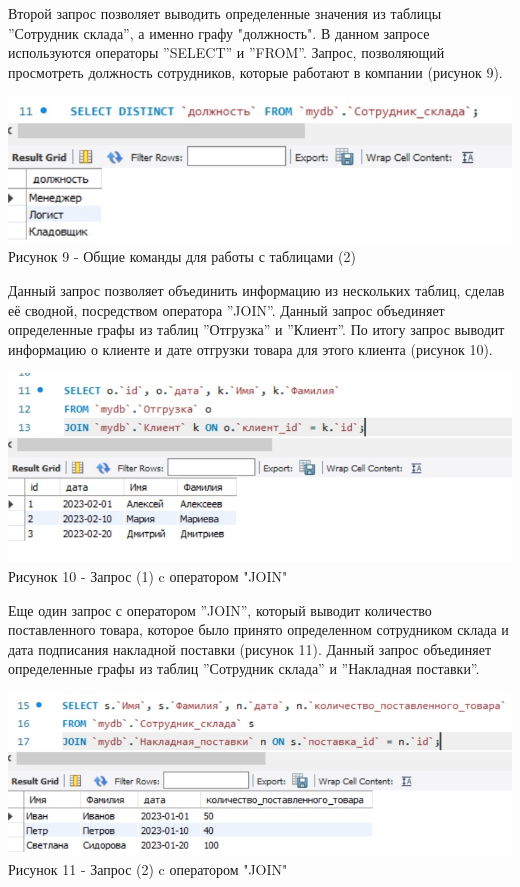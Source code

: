 \documentclass[14pt]{extreport}
\begin{document}
Второй запрос позволяет выводить определенные значения  из таблицы ''Сотрудник склада'', а именно графу "должность". В данном запросе используются операторы ''SELECT'' и ''FROM''. Запрос, позволяющий просмотреть должность сотрудников, которые работают в компании (рисунок 9).
\begin{center}
    \centering 
    \includegraphics[width=1.0\linewidth]{image2.png}
    \\Рисунок 9 - Общие команды для работы с таблицами (2)
\end{center}


Данный запрос позволяет объединить информацию из нескольких таблиц, сделав её сводной, посредством оператора ''JOIN''. Данный запрос объединяет определенные графы из таблиц ''Отгрузка'' и ''Клиент''. По итогу запрос выводит информацию о клиенте и дате отгрузки товара для этого клиента (рисунок 10).
\begin{center}
    \centering
    \includegraphics[width=1.0\linewidth]{image3.png}
    \\Рисунок 10 - Запрос (1) c оператором "JOIN" 
\end{center}


Еще один запрос с оператором ''JOIN'', который выводит количество поставленного товара, которое было принято определенном сотрудником склада и дата подписания накладной поставки (рисунок 11). Данный запрос объединяет определенные графы из таблиц ''Сотрудник склада'' и ''Накладная поставки''. 
\begin{center}
    \centering
    \includegraphics[width=1.0\linewidth]{image4.png}
    \\Рисунок 11 - Запрос (2) c оператором "JOIN"
\end{center}
\end{document}
